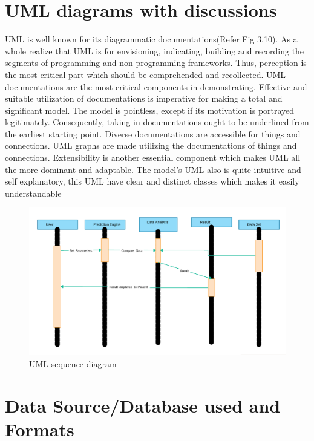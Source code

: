 \documentclass[oneside,12pt]{Classes/VTU}
\begin{document}
	\section{UML diagrams with discussions} 
	UML is well known for its diagrammatic documentations(Refer Fig 3.10). As a whole 
	realize that UML is for envisioning, indicating, building and recording the segments 
	of programming and non-programming frameworks. Thus, perception is the most 
	critical part which should be comprehended and recollected. UML documentations 
	are the most critical components in demonstrating. Effective and suitable utilization 
	of documentations is imperative for making a total and significant model. The model 
	is pointless, except if its motivation is portrayed legitimately. Consequently, taking 
	in documentations ought to be underlined from the earliest starting point. Diverse 
	documentations are accessible for things and connections. UML graphs are made 
	utilizing the documentations of things and connections. Extensibility is another essential component which makes UML all the more dominant and adaptable. The 
	model’s UML also is quite intuitive and self explanatory, this UML have clear and 
	distinct classes which makes it easily understandable
	\begin{figure}[h]
		\begin{center}
			\includegraphics[width=15cm]{images/uml_diagram.png}
			\caption{UML sequence diagram}
		\end{center}
	\end{figure}
	
	
	
	






  	
  	\section{Data Source/Database used and Formats}
\end{document}
